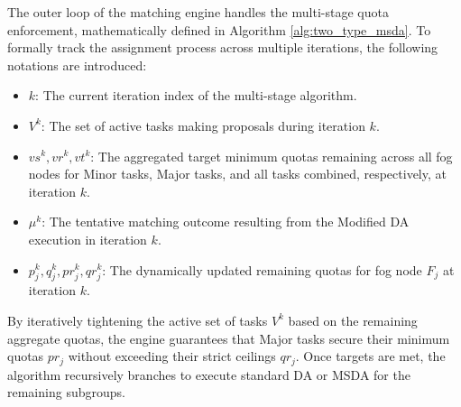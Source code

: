 \newpage
The outer loop of the matching engine handles the multi-stage quota enforcement, mathematically defined in Algorithm \ref{alg:two_type_msda}. To formally track the assignment process across multiple iterations, the following notations are introduced:
\begin{itemize}
\item $k$: The current iteration index of the multi-stage algorithm.
\item $V^k$: The set of active tasks making proposals during iteration $k$.
\item $vs^k, vr^k, vt^k$: The aggregated target minimum quotas remaining across all fog nodes for Minor tasks, Major tasks, and all tasks combined, respectively, at iteration $k$.
\item $\mu^k$: The tentative matching outcome resulting from the Modified DA execution in iteration $k$.
\item $p_j^k, q_j^k, pr_j^k, qr_j^k$: The dynamically updated remaining quotas for fog node $F_j$ at iteration $k$.
\end{itemize}

By iteratively tightening the active set of tasks $V^k$ based on the remaining aggregate quotas, the engine guarantees that Major tasks secure their minimum quotas $pr_j$ without exceeding their strict ceilings $qr_j$. Once targets are met, the algorithm recursively branches to execute standard DA or MSDA for the remaining subgroups.

